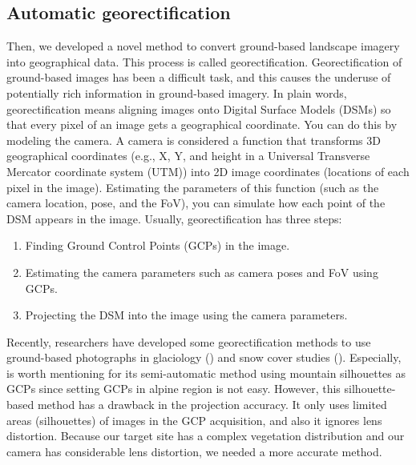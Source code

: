 \documentclass{article}
\providecommand{\tightlist}{%
  \setlength{\itemsep}{0pt}\setlength{\parskip}{0pt}}
\begin{document}
\hypertarget{automatic-georectification}{%
\subsection{Automatic georectification}\label{automatic-georectification}}

Then, we developed a novel method to convert ground-based landscape imagery into geographical data. This process is called georectification. Georectification of ground-based images has been a difficult task, and this causes the underuse of potentially rich information in ground-based imagery. In plain words, georectification means aligning images onto Digital Surface Models (DSMs) so that every pixel of an image gets a geographical coordinate. You can do this by modeling the camera. A camera is considered a function that transforms 3D geographical coordinates (e.g., X, Y, and height in a Universal Transverse Mercator coordinate system (UTM)) into 2D image coordinates (locations of each pixel in the image). Estimating the parameters of this function (such as the camera location, pose, and the FoV), you can simulate how each point of the DSM appears in the image. Usually, georectification has three steps:

\begin{enumerate}
\def\labelenumi{\arabic{enumi}.}
\tightlist
\item
  Finding Ground Control Points (GCPs) in the image.\\
\item
  Estimating the camera parameters such as camera poses and FoV using GCPs.\\
\item
  Projecting the DSM into the image using the camera parameters.
\end{enumerate}

Recently, researchers have developed some georectification methods to use ground-based photographs in glaciology (\cite{Messerli2015GeoInst}) and snow cover studies (\cite{Portenier2020Cryosphere}). Especially, \cite{Portenier2020Cryosphere} is worth mentioning for its semi-automatic method using mountain silhouettes as GCPs since setting GCPs in alpine region is not easy. However, this silhouette-based method has a drawback in the projection accuracy. It only uses limited areas (silhouettes) of images in the GCP acquisition, and also it ignores lens distortion. Because our target site has a complex vegetation distribution and our camera has considerable lens distortion, we needed a more accurate method.
\end{document}
